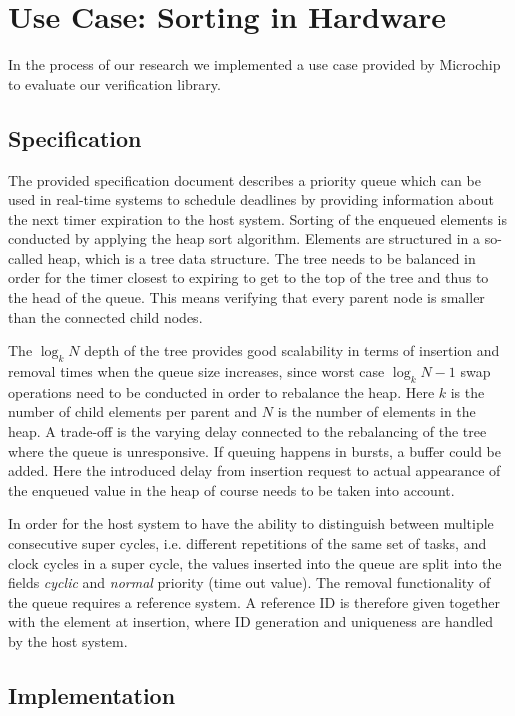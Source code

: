 \documentclass[conference]{IEEEtran}
\begin{document}
\section{Use Case: Sorting in Hardware}

In the process of our research we implemented a use case provided by Microchip to evaluate our verification library.

\subsection{Specification}

The provided specification document describes a priority queue which can be used in real-time systems to schedule deadlines by providing information about the 
next timer expiration to the host system. Sorting of the enqueued elements is conducted by applying the heap sort algorithm. Elements are structured in a so-called 
heap, which is a tree data structure. The tree needs to be balanced in order for the
timer closest to expiring to get to the top of the tree and thus to the head of the queue. This means verifying that every parent node is smaller than the connected child nodes.

The $\log_k N$ depth of the tree provides good scalability in terms of insertion and removal times when the queue size increases, 
since worst case $\log_k N-1$ swap operations need to be conducted in order to rebalance the heap. Here $k$ is the number of child elements per parent and $N$
is the number of elements in the heap. A trade-off is the varying delay connected to the rebalancing of the tree where the queue is unresponsive. If queuing
happens in bursts, a buffer could be added. Here the introduced delay from insertion request to actual appearance of the enqueued value in the heap of course needs
to be taken into account.

In order for the host system to have the ability to distinguish between multiple consecutive super cycles, i.e. different repetitions of the same set of tasks, and clock cycles in a super cycle, the values inserted 
into the queue are split into the fields \textit{cyclic} and \textit{normal} priority (time out value). The removal functionality of the queue requires a reference system. A reference 
ID is therefore given together with the element at insertion, where ID generation and uniqueness are handled by the host system.

\subsection{Implementation}
\end{document}
